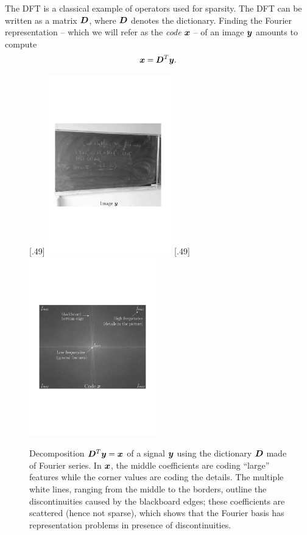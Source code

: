 The \ac{DFT} is a classical example of operators used for sparsity. The \ac{DFT} can be written as a matrix $\bm{D}$, where $\bm{D}$ denotes the dictionary. Finding the Fourier representation – which we will refer as the \emph{code} $\bm{x}$ – of an image $\bm{y}$ amounts to compute 
$$\bm{x} = \bm{D}^T\bm{y}.$$

\begin{figure}[!ht]
%
  [.49\linewidth]{\includegraphics[width=0.49\textwidth]{figures/fourier/image.pdf}}
  [.49\linewidth]{\includegraphics[width=0.49\textwidth]{figures/fourier/fourier.pdf}}
  \caption{Decomposition $\bm{D}^T\bm{y}=\bm{x}$ of a signal $\bm{y}$ using the dictionary $\bm{D}$ made of Fourier series. In $\bm{x}$, the middle coefficients are coding “large” features while the corner values are coding the details. The multiple white lines, ranging from the middle to the borders, outline the discontinuities caused by the blackboard edges; these coefficients are scattered (hence not sparse), which shows that the Fourier basis has representation problems in presence of discontinuities.} \label{fig_fourier}
\end{figure}


